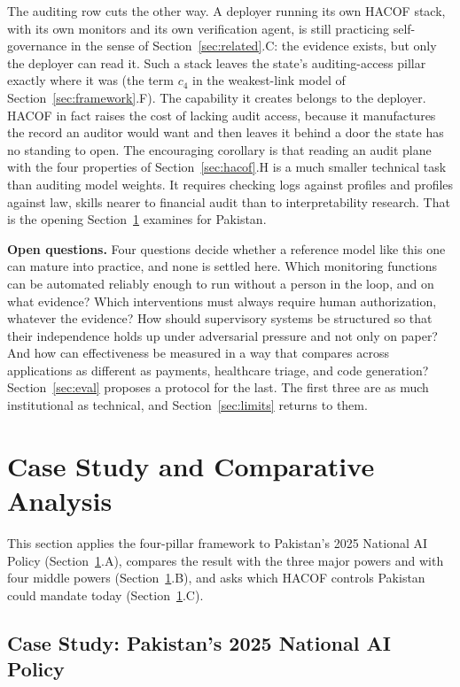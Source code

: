 \documentclass{ieeeaccess}
\newcommand{\hacof}{HACOF}
\begin{document}
The auditing row cuts the other way. A deployer running its own \hacof{} stack, with its own monitors and its own verification agent, is still practicing self-governance in the sense of Section~\ref{sec:related}.C: the evidence exists, but only the deployer can read it. Such a stack leaves the state's auditing-access pillar exactly where it was (the term $c_4$ in the weakest-link model of Section~\ref{sec:framework}.F). The capability it creates belongs to the deployer. \hacof{} in fact raises the cost of lacking audit access, because it manufactures the record an auditor would want and then leaves it behind a door the state has no standing to open. The encouraging corollary is that reading an audit plane with the four properties of Section~\ref{sec:hacof}.H is a much smaller technical task than auditing model weights. It requires checking logs against profiles and profiles against law, skills nearer to financial audit than to interpretability research. That is the opening Section~\ref{sec:case} examines for Pakistan.

\textbf{Open questions.} Four questions decide whether a reference model like this one can mature into practice, and none is settled here. Which monitoring functions can be automated reliably enough to run without a person in the loop, and on what evidence? Which interventions must always require human authorization, whatever the evidence? How should supervisory systems be structured so that their independence holds up under adversarial pressure and not only on paper? And how can effectiveness be measured in a way that compares across applications as different as payments, healthcare triage, and code generation? Section~\ref{sec:eval} proposes a protocol for the last. The first three are as much institutional as technical, and Section~\ref{sec:limits} returns to them.

\section{Case Study and Comparative Analysis}
\label{sec:case}

This section applies the four-pillar framework to Pakistan's 2025 National AI Policy (Section~\ref{sec:case}.A), compares the result with the three major powers and with four middle powers (Section~\ref{sec:case}.B), and asks which \hacof{} controls Pakistan could mandate today (Section~\ref{sec:case}.C).

\subsection{Case Study: Pakistan's 2025 National AI Policy}
\end{document}
